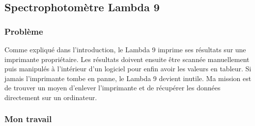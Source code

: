 \documentclass[12pt]{article}
\begin{document}
\newpage
\subsection{Spectrophotomètre Lambda 9}

\subsubsection{Problème}


Comme expliqué dans l'introduction, le Lambda 9 imprime ses résultats sur une imprimante propriétaire.
Les résultats doivent ensuite être scannée manuellement puis manipulés à l'intérieur d'un logiciel pour enfin avoir les valeurs en tableur.
Si jamais l'imprimante tombe en panne, le Lambda 9 devient inutile.
Ma mission est de trouver un moyen d'enlever l'imprimante et de récupérer les données directement sur un ordinateur.

\subsubsection{Mon travail}
\end{document}
